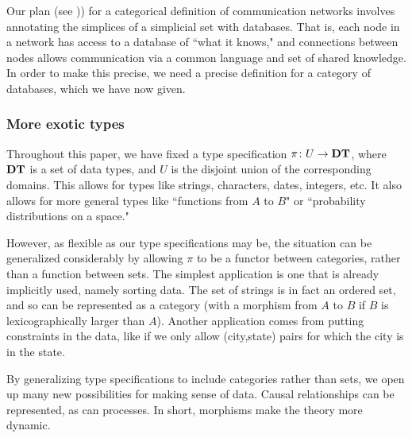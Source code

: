 \documentclass{amsart}
\def\DT{{\bf DT}}
\begin{document}
Our plan (see \cite{Spi2})) for a categorical definition of communication networks involves annotating the simplices of a simplicial set with databases.  That is, each node in a network has access to a database of ``what it knows," and connections between nodes allows communication via a common language and set of shared knowledge.  In order to make this precise, we need a precise definition for a category of databases, which we have now given.  

\subsubsection{More exotic types}\label{subsubsec:types}

Throughout this paper, we have fixed a type specification $\pi\taking U\to\DT$, where $\DT$ is a set of data types, and $U$ is the disjoint union of the corresponding domains.  This allows for types like strings, characters, dates, integers, etc.  It also allows for more general types like ``functions from $A$ to $B$" or ``probability distributions on a space."  

However, as flexible as our type specifications may be, the situation can be generalized considerably by allowing $\pi$ to be a functor between categories, rather than a function between sets.  The simplest application is one that is already implicitly used, namely sorting data.  The set of strings is in fact an ordered set, and so can be represented as a category (with a morphism from $A$ to $B$ if $B$ is lexicographically larger than $A$).  Another application comes from putting constraints in the data, like if we only allow (city,state) pairs for which the city is in the state. 

By generalizing type specifications to include categories rather than sets, we open up many new possibilities for making sense of data.  Causal relationships can be represented, as can processes.  In short, morphisms make the theory more dynamic.  




\end{document}
